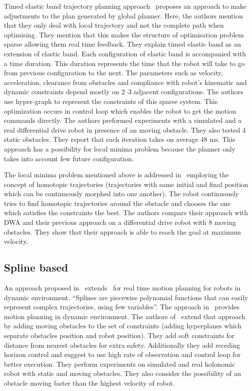 Timed elastic band trajectory planning approach~\cite{rosmann2013efficient} proposes an 
approach to make adjustments to the plan generated by global planner. Here, the authors 
mention that they only deal with local trajectory and not the complete path when optimising.
They mention that this makes the structure of optimisation problem sparse allowing them real
time feedback. They explain timed elastic band as an extension of elastic band. Each configuration
of elastic band is accompanied with a time duration. This duration represents the time that
the robot will take to go from previous configuration to the next. The parameters such as
velocity, acceleration, clearance from obstacles and compliance with robot's kinematic and
dynamic constraints depend mostly on 2--3 adjacent configurations. The authors use hyper-graph 
to represent the constraints of this sparse system. This optimization occurs in control loop
which enables the robot to get the motion commands directly. The authors preformed experiments 
with a simulated and a real differential drive robot in presence of an moving obstacle. They 
also tested 4 static obstacles. They report that each iteration takes on average 48 ms. This 
approach has a possibility for local minima problem because the planner only takes into account
few future configuration. 

The local minima problem mentioned above is addressed in~\cite{rosmann2015planning} employing
the concept of homotopic trajectories (trajectories with same initial and final position which
can be continuously morphed into one another). The robot continuously tries to find homotopic 
trajectories around the obstacle and chooses the one which satisfies the constraints the best.
The authors compare their approach with DWA and their previous approach\cite{rosmann2013efficient}
on a differential drive robot with 8 moving obstacles. They show that their approach is able to 
reach the goal at maximum velocity.

\subsection{Spline based}%
\label{sub:spline_based}

An approach proposed in~\cite{mercy2016real} extends~\cite{loock2015b} for real time motion
planning for robots in dynamic environment. ``Splines are piecewise polynomial functions 
that can easily represent complex trajectories, using few variables''\cite{mercy2016real}. 
The approach in~\cite{loock2015b} provides motion planning in dynamic environment. The 
authors of~\cite{mercy2016real} extend that approach by adding moving obstacles to the set
of constraints (adding hyperplanes which separate obstacles position and robot position). 
They add soft constraints for distance from nearest obstacles for extra safety. Additionally
they add receding horizon control and suggest to use high rate of observation and control 
loop for better execution. They perform experiments on simulated and real holonomic robot
with static and moving obstacles. They also consider the possibility of an obstacle moving
faster than the highest velocity of robot. 

